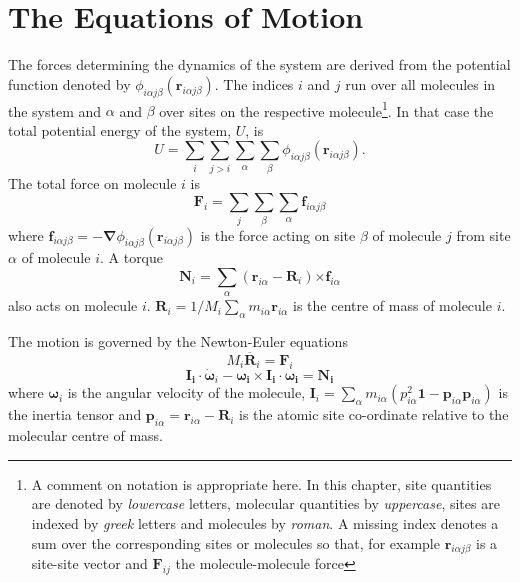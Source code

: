 \section{The Equations of Motion}
The forces determining the dynamics of the system are derived from the
potential    function    denoted     by   $\phi_{i\alpha  j\beta}(\bm{r}
_{i\alpha j\beta})$.  The indices $i$ and $j$ run  over all molecules
in the system and  $\alpha$ and $\beta$ over  sites on  the respective
molecule\footnote{A comment on notation is appropriate here.  In this
chapter, site quantities are denoted by {\em lowercase} letters,
molecular quantities by {\em uppercase}, sites are indexed by {\em greek}
letters and molecules by {\em roman}. A missing index denotes
a sum over the corresponding sites or molecules so that, for example
$\bm{r}_{i\alpha j\beta}$ is a site-site vector and $\bm{F}_{ij}$ the
molecule-molecule force}.  
In that case the total potential energy of the system, $U$, is
\begin{equation}
U = \sum_i \sum_{j > i} \sum_\alpha \sum_\beta \phi_{i\alpha j\beta}(
\bm{r}_{i\alpha j\beta}).
\end{equation}
The total force on molecule $i$ is
\begin{equation}
\label{eqn:comf}
\bm{F}_i = \sum_j \sum_\beta \sum_\alpha \bm{f}_{i\alpha j\beta}
\end{equation}
where $\bm{f}_{i\alpha j\beta} = - \bm{\nabla} \phi_{i\alpha  j\beta}(
\bm{r}_{i\alpha j\beta})$ is the force acting on site $\beta$ of molecule
$j$ from site $\alpha$ of molecule $i$.  A torque
\begin{equation}
\label{eqn:comt}
\bm{N}_i = \sum_\alpha (\bm{r}_{i \alpha} - \bm{R}_{i}) 
\bm{\times f}_{i\alpha} 
\end{equation}
also acts on molecule $i$.  $\bm{R}_{i} = 1/M_i \sum_\alpha
m_{i\alpha} \bm{r}_{i\alpha}$ is the centre of mass of molecule $i$.

The motion is governed by the Newton-Euler equations
\begin{equation}
M_i\ddot{\bm{R}_i} = \bm{F}_i \label{eqn:newton}
\end{equation}
\begin{equation}
\bm{I_i \cdot} \dot{\bm{\omega}}_i - \bm{\omega_i \times I_i \cdot
\omega_i} = \bm{N_i} \label{eqn:euler}
\end{equation}
where  $\bm{\omega}_i$ is the angular velocity of the molecule, 
$ \bm{I}_i = \sum_{\alpha} m_{i\alpha} 
( p_{i\alpha}^2 \bm{1} - \bm{p}_{i\alpha}\bm{p}_{i\alpha} ) $ 
is the inertia tensor and 
$\bm{p}_{i\alpha} = \bm{r}_{i\alpha} - \bm{R}_i $
is the atomic site co-ordinate relative to the molecular centre of mass.


